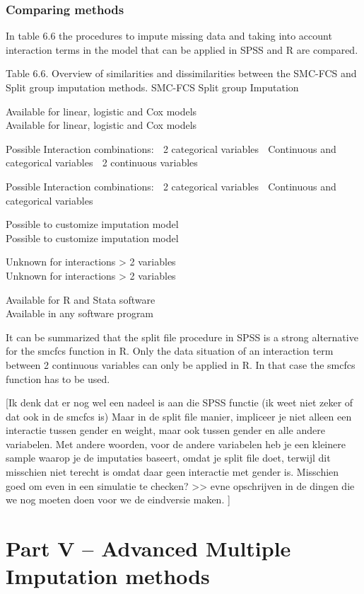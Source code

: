 \documentclass[]{book}
\begin{document}
\subsection{Comparing methods}\label{comparing-methods}

In table 6.6 the procedures to impute missing data and taking into
account interaction terms in the model that can be applied in SPSS and R
are compared.

Table 6.6. Overview of similarities and dissimilarities between the
SMC-FCS and Split group imputation methods. SMC-FCS Split group
Imputation

Available for linear, logistic and Cox models\\
Available for linear, logistic and Cox models

Possible Interaction combinations:  2 categorical variables 
Continuous and categorical variables  2 continuous variables

Possible Interaction combinations:  2 categorical variables 
Continuous and categorical variables

Possible to customize imputation model\\
Possible to customize imputation model

Unknown for interactions \textgreater{} 2 variables\\
Unknown for interactions \textgreater{} 2 variables

Available for R and Stata software\\
Available in any software program

It can be summarized that the split file procedure in SPSS is a strong
alternative for the smcfcs function in R. Only the data situation of an
interaction term between 2 continuous variables can only be applied in
R. In that case the smcfcs function has to be used.

{[}Ik denk dat er nog wel een nadeel is aan die SPSS functie (ik weet
niet zeker of dat ook in de smcfcs is) Maar in de split file manier,
impliceer je niet alleen een interactie tussen gender en weight, maar
ook tussen gender en alle andere variabelen. Met andere woorden, voor de
andere variabelen heb je een kleinere sample waarop je de imputaties
baseert, omdat je split file doet, terwijl dit misschien niet terecht is
omdat daar geen interactie met gender is. Misschien goed om even in een
simulatie te checken? \textgreater{}\textgreater{} evne opschrijven in
de dingen die we nog moeten doen voor we de eindversie maken. {]}

\chapter*{Part V -- Advanced Multiple Imputation
methods}\label{part-v-advanced-multiple-imputation-methods}
\end{document}
